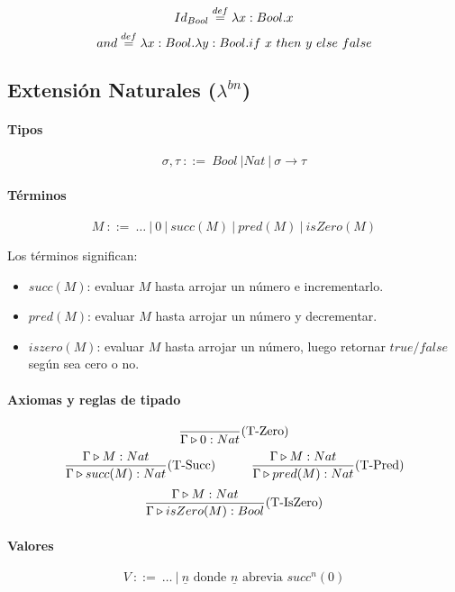 $$Id_{Bool} \overset{def}{=} \lambda x: Bool . x$$
$$and \overset{def}{=} \lambda x: Bool . \lambda y: Bool . if~ x~ then~ y~ else~ false$$

\subsection{Extensión Naturales (\texorpdfstring{$\lambda^{bn}$}{lambda bn})}

\paragraph{Tipos}
$$\sigma, \tau ~::=~ Bool~|Nat~|~\sigma\to\tau$$

\paragraph{Términos}
$$ M~::=~ \dots~|~0~|~succ(M)~|~pred(M)~|~isZero(M) $$

Los términos significan:
\begin{itemize}
    \item $succ(M)$: evaluar $M$ hasta arrojar un número e incrementarlo.
    \item $pred(M)$: evaluar $M$ hasta arrojar un número y decrementar.
    \item $iszero(M)$: evaluar $M$ hasta arrojar un número, luego retornar $true/false$ según sea cero o no.
\end{itemize}

\paragraph{Axiomas y reglas de tipado}
\begin{equation*}
\frac{}{\Gamma\triangleright 0 : Nat}(\text{T-Zero})
\end{equation*}
\vspace*{5mm}
\begin{equation*}
\frac{\Gamma\triangleright M : Nat}
{\Gamma\triangleright succ(M) : Nat}(\text{T-Succ})\hspace*{1cm}
\frac{\Gamma\triangleright M : Nat}{\Gamma\triangleright pred(M) : Nat}(\text{T-Pred})
\end{equation*}
\vspace*{5mm}
\begin{equation*}
\frac{\Gamma\triangleright M : Nat}{\Gamma\triangleright isZero(M) : Bool}(\text{T-IsZero})
\end{equation*}

\paragraph{Valores}
$$V~::=~\dots~|~\underline{n}\text{ donde } \underline{n} \text{ abrevia } succ^n(0)$$

